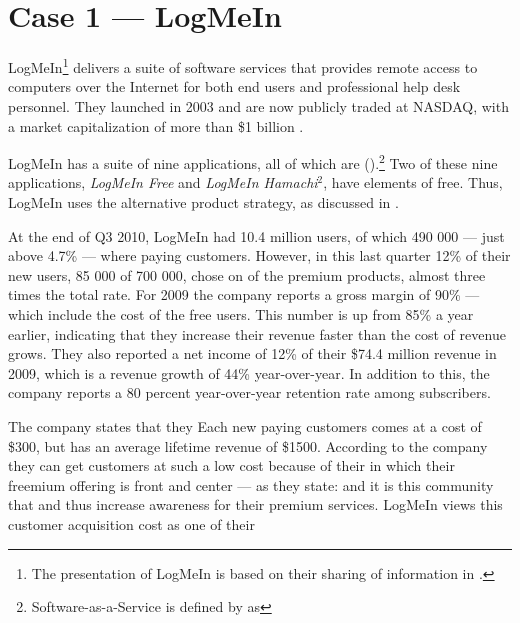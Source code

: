 \section{Case 1 --- LogMeIn}

LogMeIn\footnote{The presentation of LogMeIn is based on their sharing of information in \citet{logmein2009,logmein2010,moore2010,seitz2010,vance2009}.} delivers a suite of software services that provides remote access to computers over the Internet for both end users and professional help desk personnel. They launched in 2003 and are now publicly traded at NASDAQ, with a market capitalization of more than \$1 billion .

LogMeIn has a suite of nine applications, all of which are  ().\footnote{Software-as-a-Service is defined by \citet[]{saaksjarvi2005} as } Two of these nine applications, \emph{LogMeIn Free} and \emph{LogMeIn Hamachi$^2$}, have elements of free. Thus, LogMeIn uses the alternative product strategy, as discussed in . 

At the end of Q3 2010, LogMeIn had 10.4 million users, of which 490 000 --- just above 4.7\% --- where paying customers. However, in this last quarter 12\% of their new users, 85 000 of 700 000, chose on of the premium products, almost three times the total rate. For 2009 the company reports a gross margin of 90\% --- which include the cost of the free users. This number is up from 85\% a year earlier, indicating that they increase their revenue faster than the cost of revenue grows. They also reported a net income of 12\% of their \$74.4 million  revenue in 2009, which is a revenue growth of 44\% year-over-year. In addition to this, the company reports a 80 percent year-over-year retention rate among subscribers.

The company states that they  Each new paying customers comes at a cost of \$300, but has an average lifetime revenue of \$1500. According to the company they can get customers at such a low cost because of their  in which their freemium offering is front and center --- as they state:  and it is this community that  and thus increase awareness for their premium services. LogMeIn views this customer acquisition cost as one of their 

